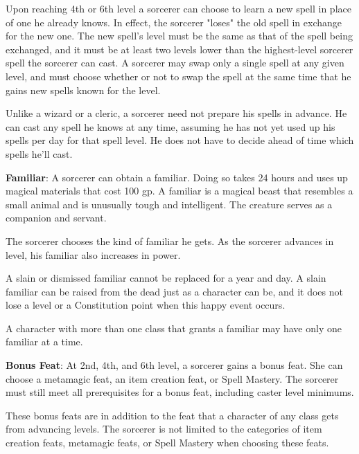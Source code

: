 Upon reaching 4th or 6th level a sorcerer can choose to learn a new spell in place of one he already knows. In effect, the sorcerer "loses" the old spell in exchange for the new one. The new spell’s level must be the same as that of the spell being exchanged, and it must be at least two levels lower than the highest-level sorcerer spell the sorcerer can cast. A sorcerer may swap only a single spell at any given level, and must choose whether or not to swap the spell at the same time that he gains new spells known for the level.

Unlike a wizard or a cleric, a sorcerer need not prepare his spells in advance. He can cast any spell he knows at any time, assuming he has not yet used up his spells per day for that spell level. He does not have to decide ahead of time which spells he’ll cast.

\textbf{Familiar}: A sorcerer can obtain a familiar. Doing so takes 24 hours and uses up magical materials that cost 100 gp. A familiar is a magical beast that resembles a small animal and is unusually tough and intelligent. The creature serves as a companion and servant.

The sorcerer chooses the kind of familiar he gets. As the sorcerer advances in level, his familiar also increases in power.

A slain or dismissed familiar cannot be replaced for a year and day. A slain familiar can be raised from the dead just as a character can be, and it does not lose a level or a Constitution point when this happy event occurs.

A character with more than one class that grants a familiar may have only one familiar at a time.

\textbf{Bonus Feat}: At 2nd, 4th, and 6th level, a sorcerer gains a bonus feat. She can choose a metamagic feat, an item creation feat, or Spell Mastery. The sorcerer must still meet all prerequisites for a bonus feat, including caster level minimums.

These bonus feats are in addition to the feat that a character of any class gets from advancing levels. The sorcerer is not limited to the categories of item creation feats, metamagic feats, or Spell Mastery when choosing these feats.